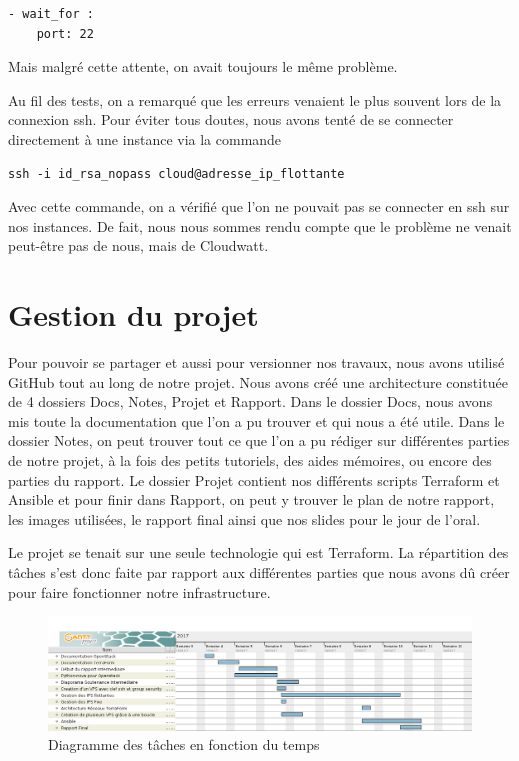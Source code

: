 \documentclass[]{article}
\begin{document}
\begin{verbatim}
- wait_for :
    port: 22
\end{verbatim}

Mais malgré cette attente, on avait toujours le même problème.

Au fil des tests, on a remarqué que les erreurs venaient le plus souvent
lors de la connexion ssh. Pour éviter tous doutes, nous avons tenté de se
connecter directement à une instance via la commande

\begin{verbatim}
ssh -i id_rsa_nopass cloud@adresse_ip_flottante
\end{verbatim}

Avec cette commande, on a vérifié que l'on ne pouvait pas se connecter en
ssh sur nos instances. De fait, nous nous sommes rendu compte que le problème ne
venait peut-être pas de nous, mais de Cloudwatt. 

\newpage
\section{Gestion du projet}\label{ruxe9partition-des-tuxe2ches-au-seins-du-groupe}

Pour pouvoir se partager et aussi pour versionner nos travaux, nous avons utilisé GitHub tout au long de notre projet. 
Nous avons créé une architecture constituée de 4 dossiers Docs, Notes, Projet et Rapport.
Dans le dossier Docs, nous avons mis toute la documentation que l'on a pu trouver et qui nous a été utile. Dans le dossier Notes, on peut trouver tout ce que l'on a pu rédiger sur différentes parties de notre projet, à la fois des petits tutoriels, des aides mémoires, ou encore des parties du rapport. Le dossier Projet contient nos différents scripts Terraform et Ansible et pour finir dans Rapport, on peut y trouver le plan de notre rapport, les images utilisées, le rapport final ainsi que nos slides pour le jour de l'oral.

Le projet se tenait sur une seule technologie qui est Terraform. La
répartition des tâches s'est donc faite par rapport aux différentes
parties que nous avons dû créer pour faire fonctionner notre
infrastructure.

\begin{figure}
\centering
\includegraphics{Images/TerraFormGant.png}
\caption{Diagramme des tâches en fonction du temps}
\end{figure}
\end{document}
